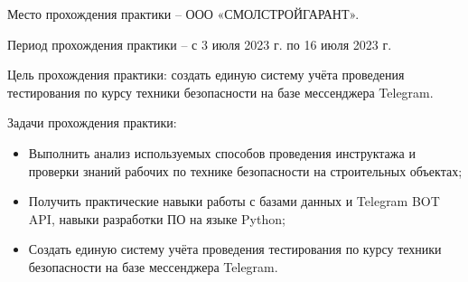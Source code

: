 \introduction %

Место прохождения практики – ООО «СМОЛСТРОЙГАРАНТ».    

Период прохождения практики – с 3 июля 2023 г. по 16 июля 2023 г.   

Цель прохождения практики: создать единую систему учёта проведения тестирования по курсу техники безопасности на базе мессенджера Telegram.  

Задачи прохождения практики:  
\begin{itemize}
\item Выполнить анализ используемых способов проведения инструктажа и проверки знаний рабочих по технике безопасности на строительных объектах;
\item Получить практические навыки работы с базами данных и Telegram BOT API, навыки разработки ПО на языке Python;
\item Создать единую систему учёта проведения тестирования по курсу техники безопасности на базе мессенджера Telegram.
\end{itemize}